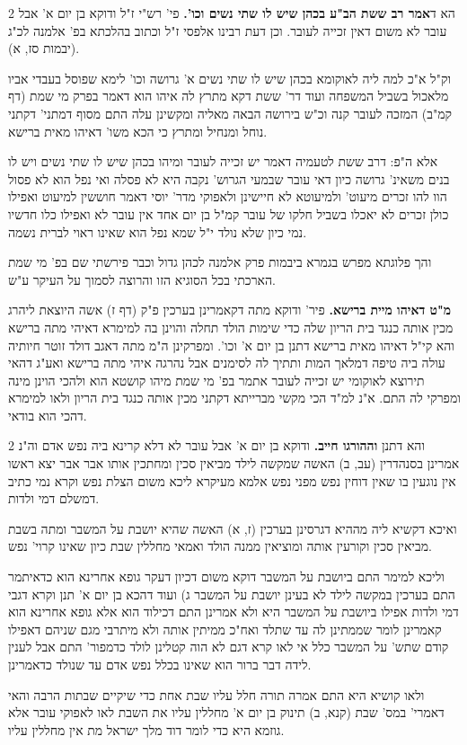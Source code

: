 \documentclass[12pt, openany]{book}
\newcommand{\sethebfont}{
\fontsize{10.5pt}{21.0pt} \selectfont
}
\newcommand{\twocol}[1]{
	{\sethebfont \begin{multicols}{2}
			#1
	\end{multicols}}	
}
\begin{document}
\twocol{הא ד\textbf{אמר רב ששת הב"ע בכהן שיש לו שתי נשים וכו'.}  פי' רש"י ז"ל ודוקא בן יום א' אבל עובר לא משום דאין זכייה לעובר. וכן דעת רבינו אלפסי ז"ל וכתוב בהלכתא בפ' אלמנה לכ"ג (יבמות סז, א).\par וק"ל א"כ למה ליה לאוקומא בכהן שיש לו שתי נשים א' גרושה וכו' לימא שפוסל בעבדי אביו מלאכול בשביל המשפחה ועוד דר' ששת דקא מתרץ לה איהו הוא דאמר בפרק מי שמת (דף קמ"ב) המזכה לעובר קנה וכ"ש בירושה הבאה מאליה ומקשינן עלה התם מסוף דמתני' דקתני נוחל ומנחיל ומתרץ כי הכא משו' דאיהו מאית ברישא.\par אלא ה"פ: דרב ששת לטעמיה דאמר יש זכייה לעובר ומיהו בכהן שיש לו שתי נשים ויש לו בנים משאינ' גרושה כיון דאי עובר שבמעי הגרוש' נקבה היא לא פסלה ואי נפל הוא לא פסול הוו להו זכרים מיעוט' ולמיעוטא לא חיישינן ולאפוקי מדר' יוסי דאמר חוששין למיעוט ואפילו כולן זכרים לא יאכלו בשביל חלקו של עובר קמ"ל בן יום אחד אין עובר לא ואפילו כלו חדשיו נמי כיון שלא נולד י"ל שמא נפל הוא שאינו ראוי לברית נשמה.\par  והך פלוגתא מפרש בגמרא ביבמות פרק אלמנה לכהן גדול וכבר פירשתי שם בפ' מי שמת הארכתי בכל הסוגיא הזו והרוצה לסמוך על העיקר ע"ש. 
\par\textbf{מ"ט דאיהו מיית ברישא.}  פיר' ודוקא מתה דקאמרינן בערכין פ"ק (דף ז) אשה היוצאת ליהרג מכין אותה כנגד בית הריון שלה כדי שימות הולד תחלה והוינן בה למימרא דאיהי מתה ברישא והא קי"ל דאיהו מאית ברישא דתנן בן יום א' וכו'. ומפרקינן ה"מ מתה דאגב דולד זוטר חיותיה עולה ביה טיפה דמלאך המות ותתיך לה לסימנים אבל נהרגה איהי מתה ברישא ואע"ג דהאי תירוצא לאוקומי יש זכייה לעובר אתמר בפ' מי שמת מיהו קושטא הוא ולהכי הוינן מינה ומפרקי לה התם. א"נ למ"ד הכי מקשי מברייתא דקתני מכין אותה כנגד בית הריון ולאו למימרא דהכי הוא בודאי. 
\par}
\twocol{והא דתנן \textbf{וההורגו חייב.}  ודוקא בן יום א' אבל עובר לא דלא קרינא ביה נפש אדם וה"נ אמרינן בסנהדרין (עב, ב) האשה שמקשה לילד מביאין סכין ומחתכין אותו אבר אבר יצא ראשו אין נוגעין בו שאין דוחין נפש מפני נפש אלמא מעיקרא ליכא משום הצלת נפש וקרא נמי כתיב דמשלם דמי ולדות.\par  ואיכא דקשיא ליה מההיא דגרסינן בערכין (ז, א) האשה שהיא יושבת על המשבר ומתה בשבת מביאין סכין וקורעין אותה ומוציאין ממנה הולד ואמאי מחללין שבת כיון שאינו קרוי' נפש.\par וליכא למימר התם ביושבת על המשבר דוקא משום דכיון דעקר גופא אחרינא הוא כדאיתמר התם בערכין במקשה לילד לא בעינן יושבת על המשבר ג) ועוד דהכא בן יום א' תנן וקרא דגבי דמי ולדות אפילו ביושבת על המשבר היא ולא אמרינן התם דכילוד הוא אלא גופא אחרינא הוא קאמרינן לומר שממתינן לה עד שתלד ואח"כ ממיתין אותה ולא מיתרבי מגם שניהם דאפילו קודם שתש' על המשבר כלל אי לאו קרא דגם לא הוה קטלינן לולד כדמפור' התם אבל לענין לידה דבר ברור הוא שאינו בכלל נפש אדם עד שנולד כדאמרינן.\par ולאו קושיא היא התם אמרה תורה חלל עליו שבת אחת כדי שיקיים שבתות הרבה והאי דאמרי' במס' שבת (קנא, ב) תינוק בן יום א' מחללין עליו את השבת לאו לאפוקי עובר אלא גוזמא היא כדי לומר דוד מלך ישראל מת אין מחללין עליו. 
\par}
\end{document}
